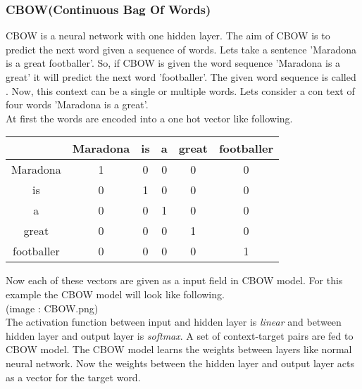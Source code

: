\documentclass[12pt]{article}
\begin{document}
\subsubsection{CBOW(Continuous Bag Of Words)}
CBOW is a neural network with one hidden layer. The aim of CBOW is to predict the next word given a sequence of words. Lets take a sentence 'Maradona is a great footballer'. So, if CBOW is given the word sequence 'Maradona is a great' it will predict the next word 'footballer'. The given word sequence is called . Now, this context can be a single or multiple words. Lets consider a con text of four words 'Maradona is a great'.\\
At first the words are encoded into a one hot vector like following.
\begin{center}
  \begin{tabular}{ | c | c | c | c | c | c |}
    \hline
      & Maradona & is & a & great & footballer\\ \hline
    Maradona & 1 & 0 & 0 & 0 & 0 \\ \hline
		is & 0 & 1 & 0 & 0 & 0 \\ \hline
		a & 0 & 0 & 1 & 0 & 0 \\ \hline
    great & 0 & 0 & 0 & 1 & 0 \\ \hline
    footballer & 0 & 0 & 0 & 0 & 1 \\
    \hline
  \end{tabular}
\end{center}
Now each of these vectors are given as a input field in CBOW model. For this example the CBOW model will look like following.\\
(image : CBOW.png)\\
The activation function between input and hidden layer is \textit{linear} and between hidden layer and output layer is \textit{softmax}. A set of context-target pairs are fed to CBOW model. The CBOW model learns the weights between layers like normal neural network. Now the weights between the hidden layer and output layer acts as a vector for the target word.
\end{document}
